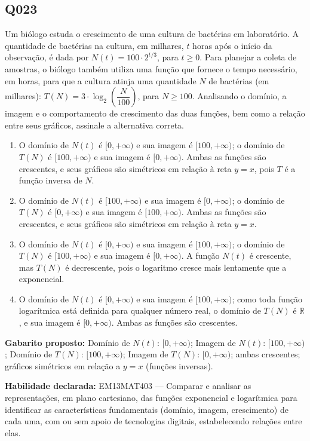 \documentclass[11pt,a4paper]{article}
\begin{document}
\begin{samepage}
\subsection*{Q023}
Um biólogo estuda o crescimento de uma cultura de bactérias em laboratório. A quantidade de bactérias na cultura, em milhares, $t$ horas após o início da observação, é dada por $N(t) = 100 \cdot 2^{t/3}$, para $t \geq 0$. Para planejar a coleta de amostras, o biólogo também utiliza uma função que fornece o tempo necessário, em horas, para que a cultura atinja uma quantidade $N$ de bactérias (em milhares): $T(N) = 3 \cdot \log_2\left(\dfrac{N}{100}\right)$, para $N \geq 100$. Analisando o domínio, a imagem e o comportamento de crescimento das duas funções, bem como a relação entre seus gráficos, assinale a alternativa correta.
\begin{enumerate}[label=(\alph*),nosep,leftmargin=*]
\item O domínio de $N(t)$ é $[0,+\infty)$ e sua imagem é $[100,+\infty)$; o domínio de $T(N)$ é $[100,+\infty)$ e sua imagem é $[0,+\infty)$. Ambas as funções são crescentes, e seus gráficos são simétricos em relação à reta $y=x$, pois $T$ é a função inversa de $N$.
\item O domínio de $N(t)$ é $[100,+\infty)$ e sua imagem é $[0,+\infty)$; o domínio de $T(N)$ é $[0,+\infty)$ e sua imagem é $[100,+\infty)$. Ambas as funções são crescentes, e seus gráficos são simétricos em relação à reta $y=x$.
\item O domínio de $N(t)$ é $[0,+\infty)$ e sua imagem é $[100,+\infty)$; o domínio de $T(N)$ é $[100,+\infty)$ e sua imagem é $[0,+\infty)$. A função $N(t)$ é crescente, mas $T(N)$ é decrescente, pois o logaritmo cresce mais lentamente que a exponencial.
\item O domínio de $N(t)$ é $[0,+\infty)$ e sua imagem é $[100,+\infty)$; como toda função logarítmica está definida para qualquer número real, o domínio de $T(N)$ é $\mathbb{R}$, e sua imagem é $[0,+\infty)$. Ambas as funções são crescentes.
\end{enumerate}

\textbf{Gabarito proposto:} Domínio de $N(t)$: $[0,+\infty)$; Imagem de $N(t)$: $[100,+\infty)$; Domínio de $T(N)$: $[100,+\infty)$; Imagem de $T(N)$: $[0,+\infty)$; ambas crescentes; gráficos simétricos em relação a $y=x$ (funções inversas).

\textbf{Habilidade declarada:} EM13MAT403 --- Comparar e analisar as representações, em plano cartesiano, das funções exponencial e logarítmica para identificar as características fundamentais (domínio, imagem, crescimento) de cada uma, com ou sem apoio de tecnologias digitais, estabelecendo relações entre elas.
\end{samepage}
\end{document}
